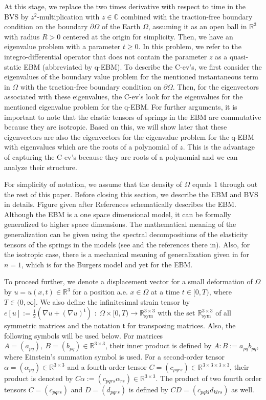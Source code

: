 \documentclass[a4paper,12pt]{article}
\newtheorem{a priori condition}[Th]{A priori condition}
\def\R{{\mathbb R}}
\begin{document}
At this stage, we replace the two times derivative with respect to time in the BVS by $z^2$-multiplication with $z\in{\mathbb C}$ combined with the traction-free boundary condition on the boundary $\partial\Omega$ of the Earth $\Omega$, assuming it as an open ball in ${\mathbb R}^3$ with radius $R>0$ centered at the origin for simplicity. Then, we have an eigenvalue problem with a parameter $t\ge0$. In this problem, we refer to the integro-differential operator that does not contain the parameter $z$ as a quasi-static EBM (abbreviated by q-EBM). To describe the C-ev's, we first consider the eigenvalues of the boundary value problem for the mentioned instantaneous term in $\Omega$ with the traction-free boundary condition on $\partial\Omega$. Then, for the eigenvectors associated with these eigenvalues, the C-ev's look for the eigenvalues for the mentioned eigenvalue problem for the q-EBM. For further arguments, it is important to note that the elastic tensors of springs in the EBM are commutative because they are isotropic. Based on this, we will show later that these eigenvectors are also the eigenvectors for the eigenvalue problem for the q-EBM with eigenvalues which are the roots of a polynomial of $z$. This is the advantage of capturing the C-ev's because they are roots of a polynomial and we can analyze their structure. 

For simplicity of notation, we assume that the density of $\Omega$ equals $1$ through out the rest of this paper. Before closing this section, we describe the EBM and BVS in details. Figure given after References schematically describes the EBM. Although the EBM is a one space dimensional model, it can be formally generalized to higher space dimensions. The mathematical meaning of the generalization can be given using the spectral decompositions of the elasticity tensors of the springs in the models (see \cite{HKLNT_IPMS, KLLNY} and the references there in). Also, for the isotropic case, there is a mechanical meaning of generalization given in \cite{Flugge} for $n=1$, which is for the Burgers model and yet for the EBM.

To proceed further, we denote a displacement vector for a small deformation of $\Omega$ by $u=u(x,t)\in\R^3$ for a position a.e. $x\in \Omega$ at a time $t\in [0,T)$, where $T\in (0,\infty ]$. We also define the infinitesimal strain tensor by $e[u]:=\frac{1}{2} (\nabla u +(\nabla u)^\mathfrak{t})$
$:~\Omega\times [0,T)\to \R^{3\times 3}_\text{sym}$ with the set ${\mathbb R}^{3\times3}_{\text{sym}}$ of all symmetric matrices and the notation $\mathfrak{t}$ for transposing matrices. Also, the following symbols will be used below.
For matrices $A=(a_{pq}),~B=(b_{pq})\in \R^{3\times 3}$, their inner product is defined by
$A:B:=a_{pq}b_{pq}$, where Einstein's summation symbol is used. For a second-order tensor $\alpha=(\alpha_{pq})\in \R^{3\times 3}$ and
a fourth-order tensor
$C=(c_{pqrs})\in \R^{3\times 3\times 3\times 3}$,
their product is denoted by
$C\alpha:=(c_{pqrs}\alpha_{rs})\in\R^{3\times 3}$.
The product of two fourth order tensors $C=(c_{pqrs})$ and $D=(d_{pqrs})$ is defined by $CD=(c_{pqkl}d_{klrs})$ as well.
\end{document}
